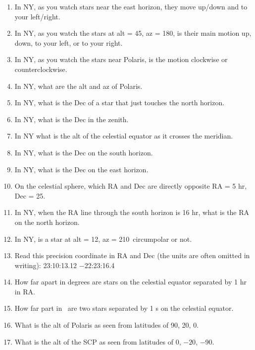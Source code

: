\begin{enumerate} 

\item
In NY, as you watch stars near the east horizon, they move up/down and
to your left/right.

\item
In NY, as you watch the stars at alt = 45\deg, az = 180\deg, 
is their main motion up, down, to your left, or to your right.

\item
In NY, as you watch the stars near Polaris, is the motion
clockwise or counterclockwise.

\item 
In NY, what are the  alt and az of Polaris. 

\item
In NY, what is the Dec of a star that just touches the north
horizon.

\item
In NY, what is the Dec in the zenith.

\item
In NY what is the alt of the celestial equator as it crosses the meridian.

\item
In NY, what is the Dec on the south horizon.

\item
In NY, what is the Dec on the east horizon.

\item
On the celestial sphere, which RA and Dec are directly opposite RA = 5
hr, Dec = 25\deg.

\item
In NY, when the RA line through the south horizon is 16 hr, what is the
RA on the north horizon.

\item
In NY, is a star at alt = 12\deg, az = 210\deg\  circumpolar or not.

\item
Read this precision coordinate in RA and Dec (the units are often
omitted in writing):  23:10:13.12 $-$22:23:16.4

\item How far apart in degrees are stars on the celestial equator
separated by 1 hr in RA.

\item 
How far part in \arcsec\ are two stars separated by 1 s on the celestial equator.

\item
What is the alt of Polaris as seen from latitudes of 90\deg, 20\deg, 0\deg.
\item
What is the alt of the SCP as seen from latitudes of 0\deg, $-20$\deg,
$-$90\deg.



\end{enumerate}
